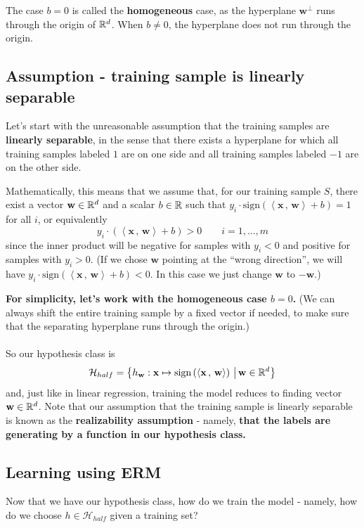 \documentclass[11pt]{article}
\newcommand{\Hc}{\mathcal{H}}
\newcommand{\innerr}[2]{{\left\langle #1\,,\,#2 \right\rangle}}
\newcommand{\VV}[1]{\mathbf{#1}}
\begin{document}
The case $b=0$ is called the {\bf homogeneous} case, as the hyperplane
$\VV{w}^\perp$ runs through the origin of $\mathbb{R}^d$. When $b\neq 0$,  the
hyperplane does not run through the origin.

\subsection{Assumption - training sample is linearly separable}

Let's start with the
unreasonable assumption that the training samples are {\bf linearly separable},
in the sense that there exists a hyperplane for which all training samples
labeled $1$ are on one side and all training samples labeled $-1$ are on the
other side. 

Mathematically, this means that we assume that, for our training sample $S$, 
there exist a vector $\VV{w}\in\reals^d$ and a scalar $b\in\mathbb{R}$ such that 
$y_i \cdot \text{sign}\left( \innerr{\VV{x}}{\VV{w}} + b \right) =1$ for all $i$, or
equivalently
\[
y_i \cdot \left( \innerr{\VV{x}}{\VV{w}} + b \right) > 0\qquad 
i=1,\ldots,m
\]
since the inner product will be negative for samples with $y_i<0$ and positive
for samples with $y_i>0$. (If we chose $\VV{w}$ pointing at the ``wrong
  direction'', we will have $y_i \cdot \text{sign}\left( \innerr{\VV{x}}{\VV{w}}
+ b \right) <0$. In this case we just change $\VV{w}$ to $-\VV{w}$.)

{\bf For simplicity, let's work with
the homogeneous case $b=0$.} (We can always shift the entire training sample by a
  fixed vector if needed, to make sure that the separating hyperplane runs
through the origin.)
\\~\\
So our hypothesis class is 
\[
  \Hc_{half} = \left\{  h_\VV{w}: \VV{x} \mapsto \text{sign}\left( \innerr{\VV{x}}{\VV{w}}  \right)
\,\big|\, \VV{w}\in \reals^d \right\}
\]
and, just like in linear regression, training the model reduces to finding
vector $\VV{w}\in\reals^d$. Note that our assumption that the training sample is
linearly separable is known as the {\bf realizability assumption} - namely, {\bf that
the labels are generating by a function in our hypothesis class.}

\subsection{Learning using ERM}

Now that we have our hypothesis class, how do we train the model - namely, how
do we choose $h\in\Hc_{half}$ given a training set?
\end{document}
